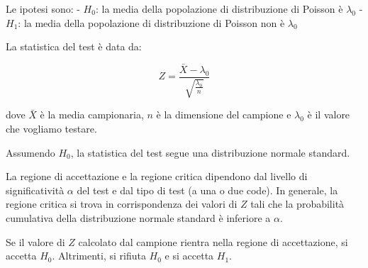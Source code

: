 Le ipotesi sono:
- $H_0$: la media della popolazione di distribuzione di Poisson è $\lambda_0$
- $H_1$: la media della popolazione di distribuzione di Poisson non è $\lambda_0$

La statistica del test è data da:

$$
Z = \frac{\bar{X} - \lambda_0}{\sqrt{\frac{\lambda_0}{n}}}
$$

dove $\bar{X}$ è la media campionaria, $n$ è la dimensione del campione e $\lambda_0$ è il valore che vogliamo testare.

Assumendo $H_0$, la statistica del test segue una distribuzione normale standard.

La regione di accettazione e la regione critica dipendono dal livello di significatività $\alpha$ del test e dal tipo di test (a una o due code). In generale, la regione critica si trova in corrispondenza dei valori di $Z$ tali che la probabilità cumulativa della distribuzione normale standard è inferiore a $\alpha$.

Se il valore di $Z$ calcolato dal campione rientra nella regione di accettazione, si accetta $H_0$. Altrimenti, si rifiuta $H_0$ e si accetta $H_1$.
